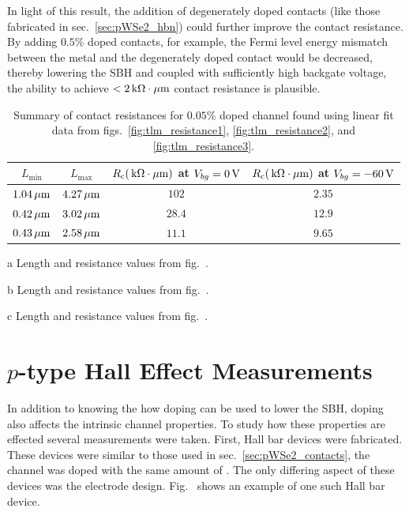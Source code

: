\noindent In light of this result, the addition of degenerately doped contacts (like those fabricated in sec.~\ref{sec:pWSe2_hbn}) could further improve the contact resistance. By adding $0.5\%$  doped  contacts, for example, the Fermi level energy mismatch between the metal and the degenerately doped  contact would be decreased, thereby lowering the \acs{SBH} and coupled with sufficiently high backgate voltage, the ability to achieve $< 2\,\mathrm{k\Omega\cdot\mu m}$ contact resistance is plausible. 
\begin{table}[ht]
	\centering
	\begin{threeparttable}
		\begin{tabular}{c c c c}
			\hline\hline
			$L_\mathrm{min}$ & $L_\mathrm{max}$ & $R_\mathrm{c}(\,\mathrm{k\Omega\cdot\mu m})$ at $V_{bg}=0\,\mathrm{V}$ & $R_\mathrm{c}(\,\mathrm{k\Omega\cdot\mu m})$ at $V_{bg}=-60\,\mathrm{V}$ \\ [0.5ex]
			\hline
			$1.04\,\mathrm{\mu m}$ & $4.27\,\mathrm{\mu m}$ & $102$\tnote{a} & $2.35$\tnote{a}\\
			$0.42\,\mathrm{\mu m}$ & $3.02\,\mathrm{\mu m}$ & $28.4$\tnote{b} & $12.9$\tnote{b}\\
			$0.43\,\mathrm{\mu m}$ & $2.58\,\mathrm{\mu m}$ & $11.1$\tnote{c} & $9.65$\tnote{c}\\ [1ex]
			\hline
		\end{tabular}
		\begin{tablenotes}
			\item[a] Length and resistance values from fig.~.
			\item[b] Length and resistance values from fig.~.
			\item[c] Length and resistance values from fig.~.
		\end{tablenotes}
	\caption[Summary of contact resistances for $0.05\%$  doped  channel]{Summary of contact resistances for $0.05\%$  doped  channel found using linear fit data from figs.~\ref{fig:tlm_resistance1}, \ref{fig:tlm_resistance2}, and \ref{fig:tlm_resistance3}.}
	\label{table:contact_summary}
	\end{threeparttable}
\end{table}

\section{$p$-type  Hall Effect Measurements}\label{sec:pWSe2_hall}
In addition to knowing the how doping can be used to lower the \acs{SBH}, doping also affects the intrinsic channel properties. To study how these properties are effected several measurements were taken. First, Hall bar devices were fabricated. These devices were similar to those used in sec.~\ref{sec:pWSe2_contacts}, the channel was doped with the same amount of . The only differing aspect of these devices was the electrode design. Fig.~ shows an example of one such Hall bar device. \\ \\

